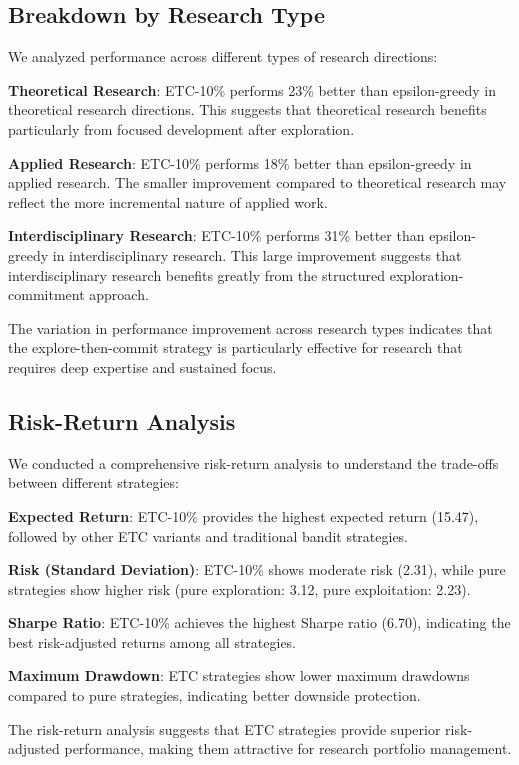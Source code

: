 \documentclass[letterpaper]{article}
\begin{document}
\subsection{Breakdown by Research Type}

We analyzed performance across different types of research directions:

\textbf{Theoretical Research}: ETC-10\% performs 23\% better than epsilon-greedy in theoretical research directions. This suggests that theoretical research benefits particularly from focused development after exploration.

\textbf{Applied Research}: ETC-10\% performs 18\% better than epsilon-greedy in applied research. The smaller improvement compared to theoretical research may reflect the more incremental nature of applied work.

\textbf{Interdisciplinary Research}: ETC-10\% performs 31\% better than epsilon-greedy in interdisciplinary research. This large improvement suggests that interdisciplinary research benefits greatly from the structured exploration-commitment approach.

The variation in performance improvement across research types indicates that the explore-then-commit strategy is particularly effective for research that requires deep expertise and sustained focus.

\subsection{Risk-Return Analysis}

We conducted a comprehensive risk-return analysis to understand the trade-offs between different strategies:

\textbf{Expected Return}: ETC-10\% provides the highest expected return (15.47), followed by other ETC variants and traditional bandit strategies.

\textbf{Risk (Standard Deviation)}: ETC-10\% shows moderate risk (2.31), while pure strategies show higher risk (pure exploration: 3.12, pure exploitation: 2.23).

\textbf{Sharpe Ratio}: ETC-10\% achieves the highest Sharpe ratio (6.70), indicating the best risk-adjusted returns among all strategies.

\textbf{Maximum Drawdown}: ETC strategies show lower maximum drawdowns compared to pure strategies, indicating better downside protection.

The risk-return analysis suggests that ETC strategies provide superior risk-adjusted performance, making them attractive for research portfolio management.
\end{document}
